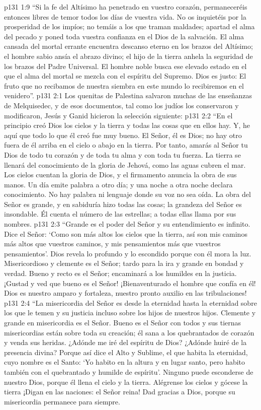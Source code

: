 \vs p131 1:9 “Si la fe del Altísimo ha penetrado en vuestro corazón, permaneceréis entonces libres de temor todos los días de vuestra vida. No os inquietéis por la prosperidad de los impíos; no temáis a los que traman maldades; apartad el alma del pecado y poned toda vuestra confianza en el Dios de la salvación. El alma cansada del mortal errante encuentra descanso eterno en los brazos del Altísimo; el hombre sabio ansía el abrazo divino; el hijo de la tierra anhela la seguridad de los brazos del Padre Universal. El hombre noble busca ese elevado estado en el que el alma del mortal se mezcla con el espíritu del Supremo. Dios es justo: El fruto que no recibamos de nuestra siembra en este mundo lo recibiremos en el venidero”.
\vs p131 2:1 Los quenitas de Palestina salvaron muchas de las enseñanzas de Melquisedec, y de esos documentos, tal como los judíos los conservaron y modificaron, Jesús y Ganid hicieron la selección siguiente:
\vs p131 2:2 \pc “En el principio creó Dios los cielos y la tierra y todas las cosas que en ellos hay. Y, he aquí que todo lo que él creó fue muy bueno. El Señor, él es Dios; no hay otro fuera de él arriba en el cielo o abajo en la tierra. Por tanto, amarás al Señor tu Dios de todo tu corazón y de toda tu alma y con toda tu fuerza. La tierra se llenará del conocimiento de la gloria de Jehová, como las aguas cubren el mar. Los cielos cuentan la gloria de Dios, y el firmamento anuncia la obra de sus manos. Un día emite palabra a otro día; y una noche a otra noche declara conocimiento. No hay palabra ni lenguaje donde su voz no sea oída. La obra del Señor es grande, y en sabiduría hizo todas las cosas; la grandeza del Señor es insondable. Él cuenta el número de las estrellas; a todas ellas llama por sus nombres.
\vs p131 2:3 “Grande es el poder del Señor y su entendimiento es infinito. Dice el Señor: ‘Como son más altos los cielos que la tierra, así son mis caminos más altos que vuestros caminos, y mis pensamientos más que vuestros pensamientos'. Dios revela lo profundo y lo escondido porque con él mora la luz. Misericordioso y clemente es el Señor; tardo para la ira y grande en bondad y verdad. Bueno y recto es el Señor; encaminará a los humildes en la justicia. ¡Gustad y ved que bueno es el Señor! ¡Bienaventurado el hombre que confía en él! Dios es nuestro amparo y fortaleza, nuestro pronto auxilio en las tribulaciones!
\vs p131 2:4 “La misericordia del Señor es desde la eternidad hasta la eternidad sobre los que le temen y su justicia incluso sobre los hijos de nuestros hijos. Clemente y grande en misericordia es el Señor. Bueno es el Señor con todos y sus tiernas misericordias están sobre toda su creación; él sana a los quebrantados de corazón y venda sus heridas. ¿Adónde me iré del espíritu de Dios? ¿Adónde huiré de la presencia divina? Porque así dice el Alto y Sublime, el que habita la eternidad, cuyo nombre es el Santo: ‘Yo habito en la altura y en lugar santo, pero habito también con el quebrantado y humilde de espíritu’. Ninguno puede esconderse de nuestro Dios, porque él llena el cielo y la tierra. Alégrense los cielos y gócese la tierra ¡Digan en las naciones: el Señor reina! Dad gracias a Dios, porque su misericordia permanece para siempre.
